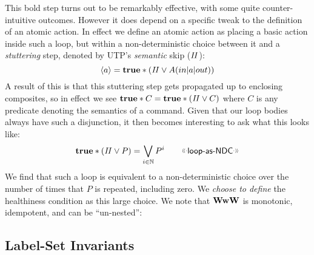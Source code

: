 This bold step turns out to be remarkably effective,
with some quite counter-intuitive outcomes.
However it does depend on a specific tweak to the
definition of an atomic action.
In effect we define an atomic action
as placing a basic action inside such a loop,
but within a non-deterministic choice between it
and a \emph{stuttering} step, denoted by UTP's \emph{semantic} skip ($\mathit{II}$):
\[
  \langle a\rangle = \mathbf{true} * (\mathit{II} \lor A(in|a|out))
\]
A result of this is that this stuttering step gets
propagated up to enclosing composites,
so in effect we see $\mathbf{true} * C = \mathbf{true} * (\mathit{II}\lor C)$
where $C$ is any predicate denoting the semantics of a command.
Given that our loop bodies always have such a disjunction,
it then becomes interesting to ask what this looks like:
\[
  \true * (\Skip \lor P) = \bigvee_{i \in \Nat} P^i
  \qquad \elabel{loop-as-NDC}
\]
We find that such a loop is equivalent to a non-deterministic
choice over the number of times that $P$ is repeated,
including zero.
We \emph{choose to define} the healthiness condition as
this large choice.
 \noindent
We note that $\mathbf{WwW}$ is monotonic, idempotent,
and can be ``un-nested'':

\subsection{Label-Set Invariants}


